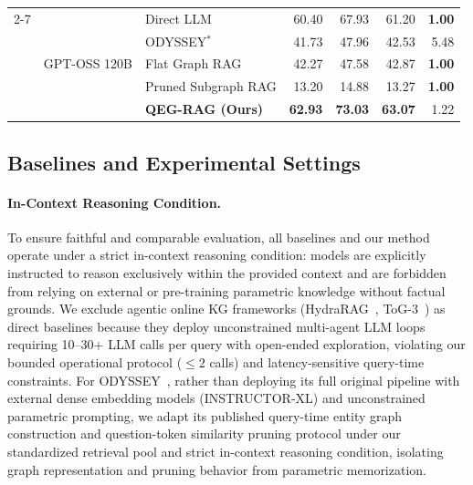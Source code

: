 \documentclass[runningheads]{llncs}
\begin{document}
\begin{table}[t]
{\begin{tabular}{@{}lllrrrr@{}}
\cmidrule{2-7}
& \multirow{5}{*}{GPT-OSS 120B} 
  & Direct LLM               & 60.40 & 67.93 & 61.20 & \textbf{1.00} \\
& & ODYSSEY$^*$~\cite{agarwal2025hybrid} & 41.73 & 47.96 & 42.53 & 5.48 \\
& & Flat Graph RAG           & 42.27 & 47.58 & 42.87 & \textbf{1.00} \\
& & Pruned Subgraph RAG      & 13.20 & 14.88 & 13.27 & \textbf{1.00} \\
& & \textbf{QEG-RAG (Ours)}  & \textbf{62.93} & \textbf{73.03} & \textbf{63.07} & 1.22 \\
\bottomrule
\end{tabular}%
}
\vspace{2.0mm}
\end{table}

\subsection{Baselines and Experimental Settings}
\paragraph{In-Context Reasoning Condition.}
To ensure faithful and comparable evaluation, all baselines and our method operate under a strict in-context reasoning condition: models are explicitly instructed to reason exclusively within the provided context and are forbidden from relying on external or pre-training parametric knowledge without factual grounds. We exclude agentic online KG frameworks (HydraRAG~\cite{tan2025hydrarag}, ToG-3~\cite{wu2025tog3}) as direct baselines because they deploy unconstrained multi-agent LLM loops requiring 10--30+ LLM calls per query with open-ended exploration, violating our bounded operational protocol ($\le 2$ calls) and latency-sensitive query-time constraints. For ODYSSEY~\cite{agarwal2025hybrid}, rather than deploying its full original pipeline with external dense embedding models (INSTRUCTOR-XL) and unconstrained parametric prompting, we adapt its published query-time entity graph construction and question-token similarity pruning protocol under our standardized retrieval pool and strict in-context reasoning condition, isolating graph representation and pruning behavior from parametric memorization.
\end{document}
